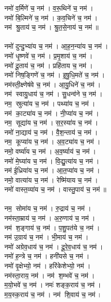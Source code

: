 नमो॑ व॒र्मिणे॑ च॒ नम॑। व॒रू॒थिने॑ च॒ नम॑। \\
नमो॑ बि॒ल्मिने॑ च॒ नम॑। क॒व॒चिने॑ च॒ नम॑। \\
नम॑ श्रु॒ताय॑ च॒ नम॑। श्रु॒त॒से॒नाय॑ च॒ नम॑॥ \\
\\
नमो॑ दुन्दु॒भ्या॑य च॒ नम॑। आ॒ह॒न॒न्या॑य च॒ नम॑। \\
नमो॑ धृ॒ष्णवे॑ च॒ नम॑। प्र॒मृ॒शाय॑ च॒ नम॑।\\
नमो॑ दू॒ताय॑ च॒ नम॑। प्रहि॑ताय च॒ नम॑। \\
नमो॑ निष॒ङ्गिणे॑ च॒ नम॑। इ॒षु॒धि॒मते॑ च॒ नम॑।\\
नम॑स्ती॒क्ष्णेष॑वे च॒ नम॑। आ॒यु॒धिने॑ च॒ नम॑। \\
नम॑ स्वायु॒धाय॑ च॒ नम॑। सु॒धन्व॑ने च॒ नम॑।\\
नम॒ स्रुत्या॑य च॒ नम॑। पथ्या॑य च॒ नम॑। \\
नम॑ का॒ट्या॑य च॒ नम॑। नी॒प्या॑य च॒ नम॑।\\
नम॒ सूद्या॑य च॒ नम॑। स॒र॒स्या॑य च॒ नम॑। \\
नमो॑ ना॒द्याय॑ च॒ नम॑। वै॒श॒न्ताय॑ च॒ नम॑।  \\
नम॒ कूप्या॑य च॒ नम॑। अ॒व॒ट्या॑य च॒ नम॑। \\
नमो॒ वर्ष्या॑य च॒ नम॑। अ॒व॒र्ष्याय॑ च॒ नम॑। \\
नमो॑ मे॒घ्या॑य च॒ नम॑। वि॒द्यु॒त्या॑य च॒ नम॑।\\
नम॑ ई॒ध्रिया॑य च॒ नम॑। आ॒त॒प्या॑य च॒ नम॑।\\
नमो॒ वात्या॑य च॒ नम॑। रेष्मि॑याय च॒ नम॑। \\
नमो॑ वास्त॒व्या॑य च॒ नम॑। वास्तु॒पाय॑ च॒ नम॑॥ \\
\\
नम॒ सोमा॑य च॒ नम॑। रु॒द्राय॑ च॒ नम॑। \\
नम॑स्ता॒म्राय॑ च॒ नम॑। अ॒रु॒णाय॑ च॒ नम॑।\\
नम॑ श॒ङ्गाय॑ च॒ नम॑। प॒शु॒पत॑ये च॒ नम॑। \\
नम॑ उ॒ग्राय॑ च॒ नम॑। भी॒माय॑ च॒ नम॑। \\
नमो॑ अग्रेव॒धाय॑ च॒ नम॑। दू॒रे॒व॒धाय॑ च॒ नम॑।\\
नमो॑ ह॒न्त्रे च॒ नम॑। हनी॑यसे च॒ नम॑। \\
नमो॑ वृ॒क्षेभ्यो॒ नम॑। हरि॑केशेभ्यो॒ नम॑।\\
नम॑स्ता॒राय॒ नम॑। नम॑ श॒म्भवे॑ च॒ नम॑। \\
म॒यो॒भवे॑ च॒ नम॑। नमः॑ शङ्क॒राय॑ च॒ नम॑। \\
म॒य॒स्क॒राय॑ च॒ नम॑। नम॑ शि॒वाय॑  च॒ नम॑। \\
